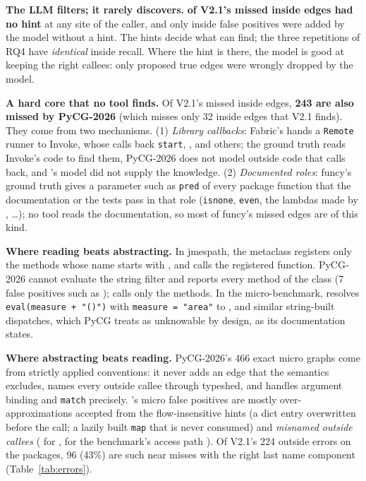 \textbf{The LLM filters; it rarely discovers.} \textbf{
of V2.1's  missed inside edges had no hint} at any site
of the caller, and only  inside false positives
were added by the model without a hint. The hints decide what \nscg can find;
the three repetitions of RQ4 have \emph{identical} inside recall. Where the hint
is there, the model is good at keeping the right callees: only
 proposed true edges were wrongly dropped by the model.

\textbf{A hard core that no tool finds.} Of V2.1's
 missed inside edges, \textbf{243 are also missed by
PyCG-2026} (which misses only 32 inside edges that V2.1 finds). They come from
two mechanisms. (1) \emph{Library callbacks}: Fabric's 
hands a \texttt{Remote} runner to Invoke, whose  calls back
\texttt{start}, ,  and
others; the ground truth reads Invoke's code to find them, PyCG-2026 does not
model outside code that calls back, and \nscg's model did not supply the
knowledge. (2) \emph{Documented roles}: funcy's ground truth gives a parameter
such as \texttt{pred} of  every package function that the
documentation or the tests pass in that role (\texttt{isnone}, \texttt{even},
the lambdas made by , \dots); no tool reads the
documentation, so most of funcy's  missed edges are
of this kind.

\textbf{Where reading beats abstracting.} In jmespath, the metaclass
 registers only the methods whose name starts with
, and  calls the registered function.
PyCG-2026 cannot evaluate the string filter and reports every method of the
class (7 false positives such as ); \nscg calls only the
 methods. In the micro-benchmark, \nscg resolves
\texttt{eval(measure + "()")} with \texttt{measure = "area"} to
, and similar string-built dispatches, which PyCG treats
as unknowable by design, as its documentation states.

\textbf{Where abstracting beats reading.} PyCG-2026's 466 exact micro graphs
come from strictly applied conventions: it never adds an edge that the
semantics excludes, names every outside callee through typeshed, and handles
argument binding and \texttt{match} precisely. \nscg's micro false positives
are mostly over-approximations accepted from the flow-insensitive hints (a dict
entry overwritten before the call; a lazily built \texttt{map} that is never
consumed) and \emph{misnamed outside callees} (
for ,
 for the benchmark's access
path ). Of
V2.1's 224 outside errors on the packages, 96 (43\%) are such near misses with
the right last name component (Table~\ref{tab:errors}).

